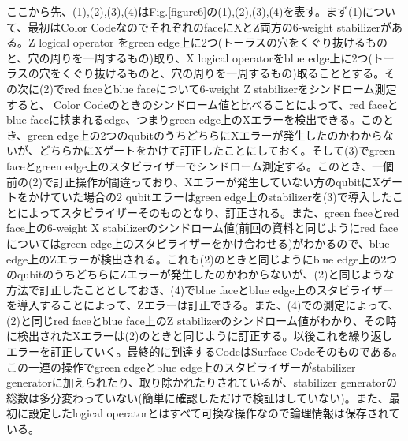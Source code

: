 \documentclass[a4paper,10pt]{ltjsarticle}
\begin{document}
{    ここから先、(1),(2),(3),(4)はFig.\ref{figure6}の(1),(2),(3),(4)を表す。まず(1)について、最初はColor CodeなのでそれぞれのfaceにXとZ両方の6-weight stabilizerがある。Z logical operator をgreen edge上に2つ(トーラスの穴をくぐり抜けるものと、穴の周りを一周するもの)取り、X logical operatorをblue edge上に2つ(トーラスの穴をくぐり抜けるものと、穴の周りを一周するもの)取ることとする。その次に(2)でred faceとblue faceについて6-weight Z stabilizerをシンドローム測定すると、 Color Codeのときのシンドローム値と比べることによって、red faceとblue faceに挟まれるedge、つまりgreen edge上のXエラーを検出できる。このとき、green edge上の2つのqubitのうちどちらにXエラーが発生したのかわからないが、どちらかにXゲートをかけて訂正したことにしておく。そして(3)でgreen faceとgreen edge上のスタビライザーでシンドローム測定する。このとき、一個前の(2)で訂正操作が間違っており、Xエラーが発生していない方のqubitにXゲートをかけていた場合の2 qubitエラーはgreen edge上のstabilizerを(3)で導入したことによってスタビライザーそのものとなり、訂正される。また、green faceとred face上の6-weight X stabilizerのシンドローム値(前回の資料と同じようにred faceについてはgreen edge上のスタビライザーをかけ合わせる)がわかるので、blue edge上のZエラーが検出される。これも(2)のときと同じようにblue edge上の2つのqubitのうちどちらにZエラーが発生したのかわからないが、(2)と同じような方法で訂正したこととしておき、(4)でblue faceとblue edge上のスタビライザーを導入することによって、Zエラーは訂正できる。また、(4)での測定によって、(2)と同じred faceとblue face上のZ stabilizerのシンドローム値がわかり、その時に検出されたXエラーは(2)のときと同じように訂正する。以後これを繰り返しエラーを訂正していく。最終的に到達するCodeはSurface Codeそのものである。この一連の操作でgreen edgeとblue edge上のスタビライザーがstabilizer generatorに加えられたり、取り除かれたりされているが、stabilizer generatorの総数は多分変わっていない(簡単に確認しただけで検証はしていない)。また、最初に設定したlogical operatorとはすべて可換な操作なので論理情報は保存されている。
}
\end{document}
